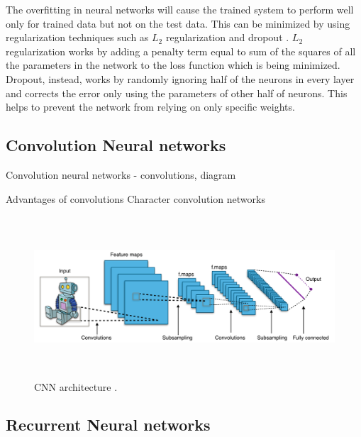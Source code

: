 \documentclass[a4paper, 11pt]{article}
\begin{document}
The overfitting in neural networks will cause the trained system to perform well only for trained data but not on the test data. This can be minimized by using regularization techniques such as $L_2$ regularization and dropout \parencite{Hinton2012}. $L_2$ regularization works by adding a penalty term equal to sum of the squares of all the parameters in the network to the loss function which is being minimized. Dropout, instead, works by randomly ignoring half of the neurons in every layer and corrects the error only using the parameters of other half of neurons. This helps to prevent the network from relying on only specific weights.

\subsection{Convolution Neural networks}

Convolution neural networks - convolutions, diagram
\parencite{lecun-bengio-95a}

Advantages of convolutions
Character convolution networks \parencite{Zhang2015}

\begin{figure}[htpb!]
    \centering
    \includegraphics[width=\textwidth,height=6cm,keepaspectratio=true]
    {cnn-1.png}
    \caption{
        CNN architecture \parencite{cnn-1}.
    }
    \label{fig:CNN architecture}
\end{figure}



\subsection{Recurrent Neural networks}

\end{document}
